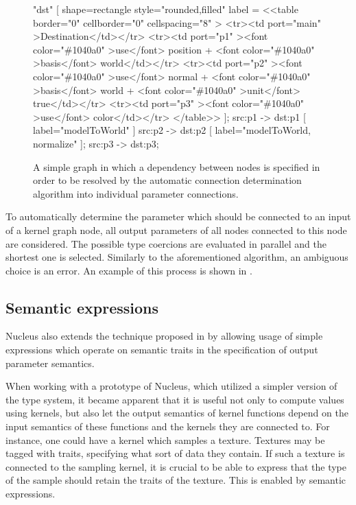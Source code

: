 \begin{figure}[ht!]
{{    		"dst" [
    			shape=rectangle style="rounded,filled"
    			label = <<table border="0" cellborder="0" cellspacing="8" >
    			<tr><td port="main" >Destination</td></tr>
    			<tr><td port="p1" ><font color="\#1040a0" >use</font> position + <font color="\#1040a0" >basis</font> world</td></tr>
    			<tr><td port="p2" ><font color="\#1040a0" >use</font> normal + <font color="\#1040a0" >basis</font> world + <font color="\#1040a0" >unit</font> true</td></tr>
    			<tr><td port="p3" ><font color="\#1040a0" >use</font> color</td></tr>
    			</table>>
    		];
    		src:p1 -> dst:p1 [ label="modelToWorld" ]
    		src:p2 -> dst:p2 [ label="modelToWorld, normalize" ];
    		src:p3 -> dst:p3;
	}}
  \caption[Automatic connection determination example]{A simple graph in which a dependency between nodes is specified in order to be resolved by the automatic connection determination algorithm into individual parameter connections.}
  \label{fig:AutoSemanticGraph}
\end{figure}

To automatically determine the parameter which should be connected to an input of a kernel graph node, all output parameters of all nodes connected to this node are considered. The possible type coercions are evaluated in parallel and the shortest one is selected. Similarly to the aforementioned algorithm, an ambiguous choice is an error. An example of this process is shown in .

\subsection{Semantic expressions}
\label{sec:SemanticExpressions}

Nucleus also extends the technique proposed in \cite{mcguire2006shadetrees} by allowing usage of simple expressions which operate on semantic traits in the specification of output parameter semantics.

When working with a prototype of Nucleus, which utilized a simpler version of the type system, it became apparent that it is useful not only to compute values using kernels, but also let the output semantics of kernel functions depend on the input semantics of these functions and the kernels they are connected to. For instance, one could have a kernel which samples a texture. Textures may be tagged with traits, specifying what sort of data they contain. If such a texture is connected to the sampling kernel, it is crucial to be able to express that the type of the sample should retain the traits of the texture. This is enabled by semantic expressions.

